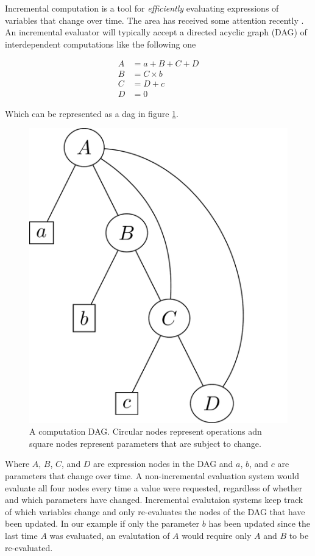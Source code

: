 Incremental computation is a tool for \emph{efficiently} evaluating
expressions of variables that change over time. The area has received
some attention recently
\cite{bhatotiaIncoopMapReduceIncremental2011,hammerAdaptonComposableDemanddriven2014a}. An
incremental evaluator will typically accept a directed acyclic graph
(DAG) of interdependent computations like the following one

\begin{align*}
A &= a + B + C + D  \\
B &= C \times b \\
C & = D + c \\
D &= 0
\end{align*}

Which can be represented as a dag in figure
\ref{fig:example_antisthenis_dag}.

\begin{figure}[H]
\centering
\includegraphics[width=.5\textwidth]{./imgs/example_antisthenis_dag.pdf}
\caption{\label{fig:example_antisthenis_dag}A computation
  DAG. Circular nodes represent operations adn square nodes represent
  parameters that are subject to change.}
\end{figure}

Where \(A\), \(B\), \(C\), and \(D\) are expression nodes in the DAG
and \(a\), \(b\), and \(c\) are parameters that change over time. A
non-incremental evaluation system would evaluate all four nodes every
time a value were requested, regardless of whether and which
parameters have changed. Incremental evalutaion systems keep track of
which variables change and only re-evaluates the nodes of the DAG that
have been updated. In our example if only the parameter \(b\) has been
updated since the last time \(A\) was evaluated, an evalutation of
\(A\) would require only \(A\) and \(B\) to be re-evaluated.

